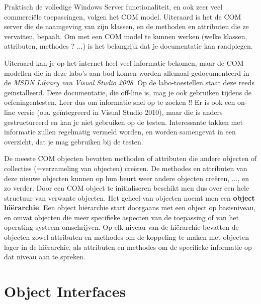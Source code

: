 \documentclass[11pt,a4paper]{report}
\begin{document}
Praktisch de volledige Windows Server functionaliteit, en ook zeer veel commerciële toepassingen, volgen het COM model. Uiteraard is het de COM server die de naamgeving van zijn klassen, en de methoden en attributen die ze vervatten, bepaalt. Om met een COM model te kunnen werken (welke klassen, attributen, methodes ? ...) is het belangrijk dat je documentatie kan raadplegen. 
\par Uiteraard kan je op het internet heel veel informatie bekomen, maar de COM modellen die in deze labo's aan bod komen worden allemaal gedocumenteerd in de \textit{MSDN Library van Visual Studio 2008}. Op de labo-toestellen staat deze reeds geïnstalleerd. Deze documentatie, die off-line is, mag je ook gebruiken tijdens de oefeningentesten. Leer dus om informatie snel op te zoeken !! Er is ook een on-line versie (o.a. geïntegreerd in Visual Studio 2010), maar die is anders gestructureerd en kan je niet gebruiken op de testen. Interessante takken met informatie zullen regelmatig vermeld worden, en worden samengevat in een overzicht, dat je mag gebruiken bij de testen.
\par De meeste COM objecten bevatten methoden of attributen die andere objecten of collecties (=verzameling van objecten) creëren. De methodes en attributen van deze nieuwe objecten kunnen op hun beurt weer andere objecten creëren, ..., en zo verder. Door een COM object te initialiseren beschikt men dus over een hele structuur van verwante objecten. Het geheel van objecten noemt men een \textbf{object hiërarchie}. Een object hiërarchie start doorgaans met een object op basisniveau, en omvat objecten die meer specifieke aspecten van de toepassing of van het operating systeem omschrijven. Op elk niveau van de hiërarchie bevatten de objecten zowel attributen en methodes om de koppeling te maken met objecten lager in de hiërarchie, als attributen en methodes om de specifieke informatie op dat niveau aan te spreken.

\section{Object Interfaces}
\end{document}
